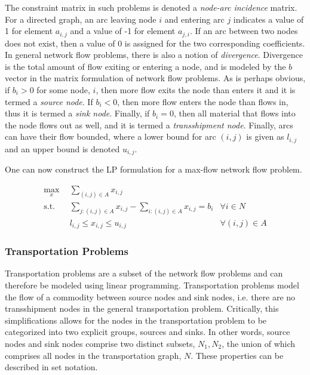 The constraint matrix in such problems is denoted a \textit{node-arc incidence}
matrix. For a directed graph, an arc leaving node $i$ and entering arc $j$
indicates a value of 1 for element $a_{i,j}$ and a value of -1 for element
$a_{j,i}$. If an arc between two nodes does not exist, then a value of 0 is
assigned for the two corresponding coefficients. In general network flow
problems, there is also a notion of \textit{divergence}. Divergence is the total
amount of flow exiting or entering a node, and is modeled by the $b$ vector in
the matrix formulation of network flow problems. As is perhaps obvious, if $b_i
> 0$ for some node, $i$, then more flow exits the node than enters it and it is
termed a \textit{source node}. If $b_i < 0$, then more flow enters the node than
flows in, thus it is termed a \textit{sink node}. Finally, if $b_i = 0$, then
all material that flows into the node flows out as well, and it is termed a
\textit{transshipment node}. Finally, arcs can have their flow bounded, where a
lower bound for arc $(i, j)$ is given as $l_{i,j}$ and an upper bound is denoted
$u_{i,j}$.

One can now construct the LP formulation for a max-flow network flow problem.

\begin{subequations}\label{eqs:max-flow}
  \begin{align}
    \max_{x} \:\: & 
    \sum_{(i, j) \in A} x_{i,j}
    & \label{eqs:max-flow_obj} \\
    \text{s.t.} \:\: &
    \sum_{j:(i,j) \in A} x_{i,j} - \sum_{i:(i,j) \in A} x_{i,j} = b_i
    & \forall i \in N \label{eqs:max-flow_sup} \\
    &
    l_{i,j} \leq x_{i,j} \leq u_{i,j}
    & \forall (i, j) \in A \label{eqs:max-flow_x}
  \end{align}
\end{subequations}

\subsubsection{Transportation Problems}
Transportation problems are a subset of the network flow problems and can
therefore be modeled using linear programming. Transportation problems model the
flow of a commodity between source nodes and sink nodes, i.e. there are no
transshipment nodes in the general transportation problem. Critically, this
simplifications allows for the nodes in the transportation problem to be
categorized into two explicit groups, sources and sinks. In other words, source
nodes and sink nodes comprise two distinct subsets, $N_1, N_2$, the union of
which comprises all nodes in the transportation graph, $N$. These properties can
be described in set notation.

